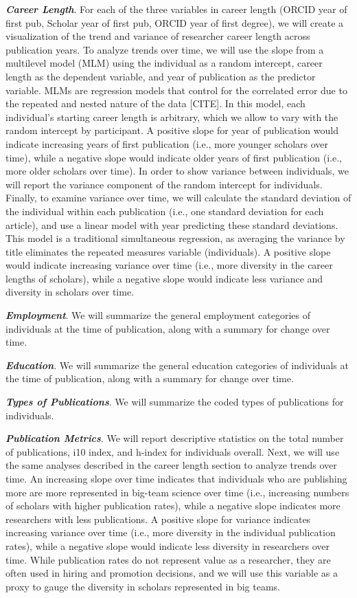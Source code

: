 \documentclass[
  english,
  man]{apa6}
\begin{document}
\textbf{\emph{Career Length}}. For each of the three variables in career length (ORCID year of first pub, Scholar year of first pub, ORCID year of first degree), we will create a visualization of the trend and variance of researcher career length across publication years. To analyze trends over time, we will use the slope from a multilevel model (MLM) using the individual as a random intercept, career length as the dependent variable, and year of publication as the predictor variable. MLMs are regression models that control for the correlated error due to the repeated and nested nature of the data {[}CITE{]}. In this model, each individual's starting career length is arbitrary, which we allow to vary with the random intercept by participant. A positive slope for year of publication would indicate increasing years of first publication (i.e., more younger scholars over time), while a negative slope would indicate older years of first publication (i.e., more older scholars over time). In order to show variance between individuals, we will report the variance component of the random intercept for individuals. Finally, to examine variance over time, we will calculate the standard deviation of the individual within each publication (i.e., one standard deviation for each article), and use a linear model with year predicting these standard deviations. This model is a traditional simultaneous regression, as averaging the variance by title eliminates the repeated measures variable (individuals). A positive slope would indicate increasing variance over time (i.e., more diversity in the career lengths of scholars), while a negative slope would indicate less variance and diversity in scholars over time.

\textbf{\emph{Employment}}. We will summarize the general employment categories of individuals at the time of publication, along with a summary for change over time.

\textbf{\emph{Education}}. We will summarize the general education categories of individuals at the time of publication, along with a summary for change over time.

\textbf{\emph{Types of Publications}}. We will summarize the coded types of publications for individuals.

\textbf{\emph{Publication Metrics}}. We will report descriptive statistics on the total number of publications, i10 index, and h-index for individuals overall. Next, we will use the same analyses described in the career length section to analyze trends over time. An increasing slope over time indicates that individuals who are publishing more are more represented in big-team science over time (i.e., increasing numbers of scholars with higher publication rates), while a negative slope indicates more researchers with less publications. A positive slope for variance indicates increasing variance over time (i.e., more diversity in the individual publication rates), while a negative slope would indicate less diversity in researchers over time. While publication rates do not represent value as a researcher, they are often used in hiring and promotion decisions, and we will use this variable as a proxy to gauge the diversity in scholars represented in big teams.
\end{document}
